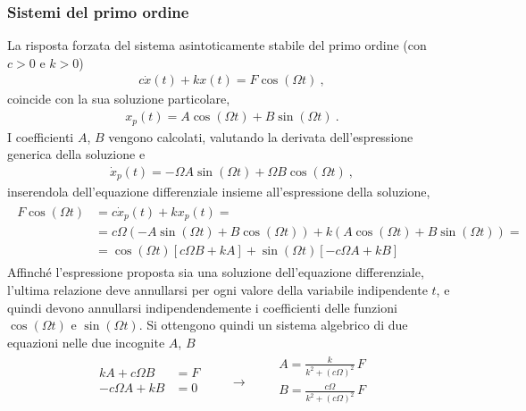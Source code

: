 \documentclass[letterpaper,10pt,italian]{jupyterBook}
\begin{document}
\subsubsection{Sistemi del primo ordine}
\label{\detokenize{ch/ode-lti:sistemi-del-primo-ordine}}
\sphinxAtStartPar
La risposta forzata del sistema asintoticamente stabile del primo ordine (con \(c > 0\) e \(k > 0\))
\begin{equation*}
\begin{split}c \dot{x}(t) + k x(t) = F \cos(\Omega t) \ ,\end{split}
\end{equation*}
\sphinxAtStartPar
coincide con la sua soluzione particolare,
\begin{equation*}
\begin{split}x_p(t) = A \cos(\Omega t) + B \sin(\Omega t) \ .\end{split}
\end{equation*}
\sphinxAtStartPar
I coefficienti \(A\), \(B\) vengono calcolati, valutando la derivata dell’espressione generica della soluzione e
\begin{equation*}
\begin{split}\dot{x}_p(t) = -\Omega A \sin(\Omega t) + \Omega B \cos(\Omega t) \ ,\end{split}
\end{equation*}
\sphinxAtStartPar
inserendola dell’equazione differenziale insieme all’espressione della soluzione,
\begin{equation*}
\begin{split}\begin{aligned}
 F \cos (\Omega t)
 & = c \dot{x}_p(t) + k x_p(t) = \\
 & = c \Omega \left( - A \sin(\Omega t) + B \cos(\Omega t)  \right) + k \left( A \cos(\Omega t) + B \sin(\Omega t) \right) = \\
 & = \cos(\Omega t) \left[ c \Omega B + k A \right] + \sin(\Omega t) \left[ - c \Omega A + k B \right]
\end{aligned}\end{split}
\end{equation*}
\sphinxAtStartPar
Affinché l’espressione proposta sia una soluzione dell’equazione differenziale, l’ultima relazione deve annullarsi per ogni valore della variabile indipendente \(t\), e quindi devono annullarsi indipendendemente i coefficienti delle funzioni \(\cos(\Omega t)\) e \(\sin (\Omega t)\). Si ottengono quindi un sistema algebrico di due equazioni nelle due incognite \(A\), \(B\)
\begin{equation*}
\begin{split}
\begin{aligned}
  k A + c \Omega B & = F \\
 - c \Omega A + k B & = 0 \\
\end{aligned}
\qquad \rightarrow \qquad
\begin{aligned}
  A = \frac{k}{k^2 + (c \Omega)^2} \, F \\
  B = \frac{c\Omega}{k^2 + (c \Omega)^2} \, F  \\
\end{aligned}
\end{split}
\end{equation*}
\end{document}
